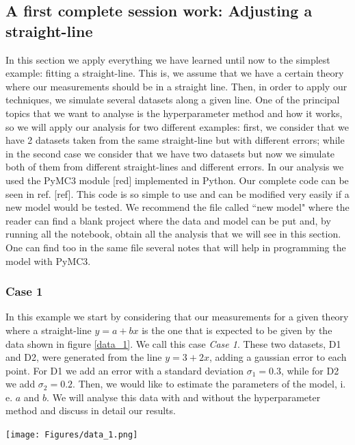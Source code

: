 \documentclass[onecolumn,           %
               showpacs,            %
               preprintnumbers,     %
               aps,                 %
               prl,          	    %
               letterpaper,             %
               superscriptaddress,      %
               nofootinbib,         %
               tightenlines,        %
               floats,floatfix      %
               ,usenatbib,
               ]{revtex4-1}
\begin{document}
 \subsection{A first complete session work: Adjusting a straight-line}

In this section we apply everything we have learned until now to the simplest example: fitting a straight-line. This is, we assume that we have a certain theory where our measurements should be in a straight line. Then, in order to apply our techniques, we simulate several datasets along a given line. One of the principal topics that we want to analyse is the hyperparameter method and how it works, so we will apply our analysis for two different examples: first, we consider that we have 2 datasets taken from the same straight-line but with different errors; while in the second case we consider that we have two datasets but now we simulate both of them from different straight-lines and different errors. In our analysis we used the PyMC3 module [red] implemented in Python. Our complete code can be seen in ref. [ref]. This code is so simple to use and can be modified very easily if a new model would be tested. We recommend the file called ``new model" where the reader can find a blank project where the data and model can be put and, by running all the notebook, obtain all the analysis that we will see in this section. One can find too in the same file several notes that will help in programming the model with PyMC3. 

\subsubsection{Case 1}

In this example we start by considering that our measurements for a given theory where a straight-line $y=a+bx$ is the one that is expected to be given by the data shown in figure \ref{data_1}. We call this case \textit{Case 1}. These two datasets, D1 and D2, were generated from the line $y=3+2x$, adding a gaussian error to each point. For D1 we add an error with a standard deviation $\sigma_1 = 0.3$, while for D2 we add $\sigma_2 = 0.2$. Then, we would like to estimate the parameters of the model, i. e. $a$ and $b$. We will analyse this data with and without the hyperparameter method and discuss in detail our results.

\begin{minipage}{\textwidth}
\centering
\texttt{[image: Figures/data\_1.png]}
\label{data_1}
\end{minipage}
\end{document}
